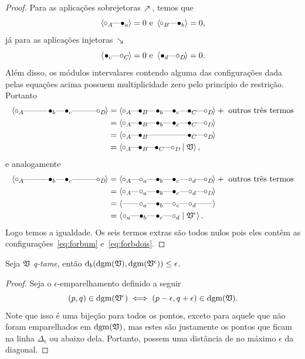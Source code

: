 \begin{proof}
Para as aplicações sobrejetoras $\surjarrow$, temos que
\begin{equation}\label{eq:forbum}
    \innerproduct{\qoff{A} \qem \qon{a}} = 0 \text{ e } \innerproduct{\qoff{B} \qem \qon{b}} = 0,
\end{equation}
já para as aplicações injetoras $\injarrow$
\begin{equation}\label{eq:forbdois}
    \innerproduct{\qon{c} \qem \qoff{C}} = 0 \text{ e } \innerproduct{\qon{d} \qem \qoff{D}} = 0.
\end{equation}
Além disso, os módulos intervalares contendo alguma das configurações dada pelas equações acima
possuem multiplicidade zero pelo princípio de restrição. Portanto
\begin{align*}
    \innerproduct{\qoff{A} \qem \qno \qem \qon{b} \qem \qon{c} \qem \qno \qem \qoff{D}} &=
    \innerproduct{\qoff{A} \qem \qon{B} \qem \qon{b} \qem \qon{c} \qem \qon{C} \qem \qoff{D}} + \text{ outros
    três termos} \\
    & = \innerproduct{\qoff{A} \qem \qon{B} \qem \qon{b} \qem \qon{c} \qem \qon{C} \qem \qoff{D}} \\
    & = \innerproduct{\qoff{A} \qem \qon{B} \qem \qno \qem \qno \qem \qon{C} \qem \qoff{D}} \\
    & = \innerproduct{\qoff{A} \qem \qon{B} \qem \qon{C} \qem \qoff{D} \mid \frakv},
\end{align*}
e analogamente
\begin{align*}
    \innerproduct{\qoff{A} \qem \qno \qem \qon{b} \qem \qon{c} \qem \qno \qem \qoff{D}} &=
    \innerproduct{\qoff{A} \qem \qoff{a} \qem \qon{b} \qem \qon{c} \qem \qoff{d} \qem \qoff{D}} + \text{ outros
    três termos} \\
    & = \innerproduct{\qoff{A} \qem \qoff{a} \qem \qon{b} \qem \qon{c} \qem \qoff{d} \qem \qoff{D}} \\
    & = \innerproduct{\qno \qem \qoff{a} \qem \qon{b} \qem \qoff{c} \qem \qoff{d} \qem \qno} \\
    & = \innerproduct{\qoff{a} \qem \qon{b} \qem \qon{c} \qem \qoff{d} \mid \frakv^\epsilon}.
\end{align*}
Logo temos a igualdade. Os seis termos extras são todos nulos pois eles contêm as configurações~\eqref{eq:forbum}
e~\eqref{eq:forbdois}.
\end{proof}

\begin{cor}\label{teo:corvolta}
    Seja $\mathfrak{V}$ \textit{q-tame}, então $\text{d}_b(\text{dgm}(\mathfrak{V}), \text{dgm}(\mathfrak{V}^\epsilon)) 
    \leq \epsilon$.
\end{cor}
\begin{proof}
    Seja o $\epsilon$-emparelhamento definido a seguir
    \begin{equation*}
        (p,q) \in \text{dgm}(\mathfrak{V}^\epsilon) \iff (p - \epsilon, q + \epsilon) \in \text{dgm}(\mathfrak{V}).
    \end{equation*}
    Note que isso é uma bijeção para todos os pontos, exceto para aquele que não foram emparelhados
    em $\text{dgm}(\mathfrak{V})$, mas estes são justamente os pontos que ficam na linha $\Delta_\epsilon$ ou abaixo
    dela. Portanto, possem uma distância de no máximo $\epsilon$ da diagonal. 
\end{proof}

